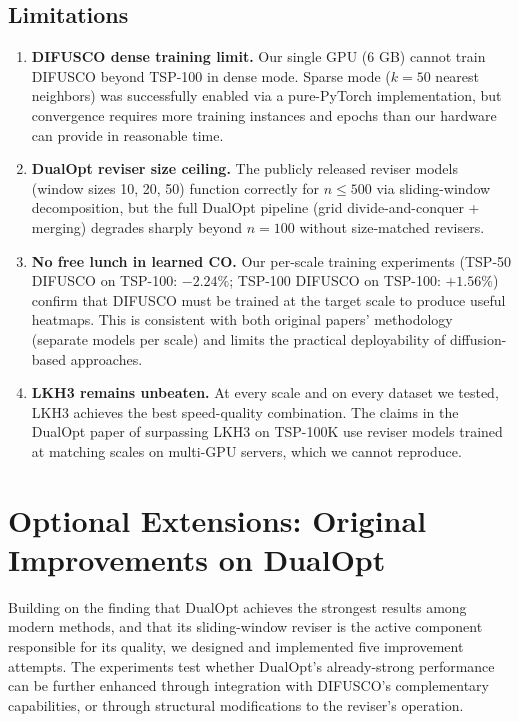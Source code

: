 \documentclass[11pt,a4paper]{article}
\begin{document}
\subsection{Limitations}

\begin{enumerate}[nosep]
\item \textbf{DIFUSCO dense training limit.} Our single GPU (6 GB) cannot train DIFUSCO beyond TSP-100 in dense mode. Sparse mode ($k=50$ nearest neighbors) was successfully enabled via a pure-PyTorch implementation, but convergence requires more training instances and epochs than our hardware can provide in reasonable time.
\item \textbf{DualOpt reviser size ceiling.} The publicly released reviser models (window sizes 10, 20, 50) function correctly for $n \leq 500$ via sliding-window decomposition, but the full DualOpt pipeline (grid divide-and-conquer + merging) degrades sharply beyond $n=100$ without size-matched revisers.
\item \textbf{No free lunch in learned CO.} Our per-scale training experiments (TSP-50 DIFUSCO on TSP-100: $-2.24\%$; TSP-100 DIFUSCO on TSP-100: $+1.56\%$) confirm that DIFUSCO must be trained at the target scale to produce useful heatmaps. This is consistent with both original papers' methodology (separate models per scale) and limits the practical deployability of diffusion-based approaches.
\item \textbf{LKH3 remains unbeaten.} At every scale and on every dataset we tested, LKH3 achieves the best speed-quality combination. The claims in the DualOpt paper of surpassing LKH3 on TSP-100K use reviser models trained at matching scales on multi-GPU servers, which we cannot reproduce.
\end{enumerate}

\section{Optional Extensions: Original Improvements on DualOpt}
\label{sec:improvements}

Building on the finding that DualOpt achieves the strongest results among modern methods, and that its sliding-window reviser is the active component responsible for its quality, we designed and implemented five improvement attempts. The experiments test whether DualOpt's already-strong performance can be further enhanced through integration with DIFUSCO's complementary capabilities, or through structural modifications to the reviser's operation.
\end{document}
